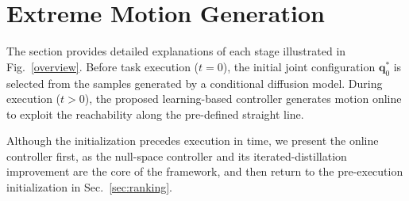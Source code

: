 \documentclass[journal, twoside]{IEEEtran}
\begin{document}
\section{Extreme Motion Generation}
The section provides detailed explanations of each stage illustrated in Fig.~\ref{overview}. Before task execution ($t=0$), the initial joint configuration $\mathbf{q}_{0}^{*}$ is selected from the samples generated by a conditional diffusion model. During execution ($t>0$), the proposed learning-based controller generates motion online to exploit the reachability along the pre-defined straight line.

Although the initialization precedes execution in time, we present the online controller first, as the null-space controller and its iterated-distillation improvement are the core of the framework, and then return to the pre-execution initialization in Sec.~\ref{sec:ranking}.

\end{document}
